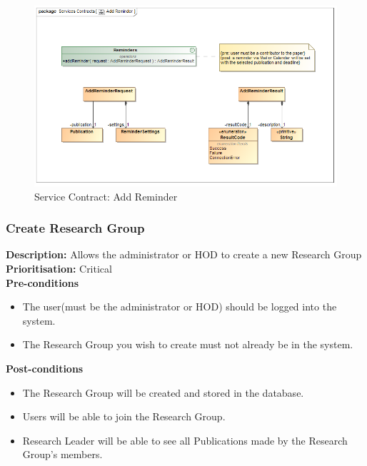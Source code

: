\documentclass[a4paper]{article}
\begin{document}
            	\begin{figure}[H]
            		\centering
            		\includegraphics[width=\textwidth]{5.1.10.Add.Reminder.Services.Contract.png}
            		\caption{Service Contract: Add Reminder}
            	\end{figure}
        
    \pagebreak
	\subsubsection{Create Research Group}
	\textbf{Description:} Allows the administrator or HOD to create a new Research Group\\
	\textbf{Prioritisation:} Critical\\
	
	\textbf{Pre-conditions}
	 \begin{itemize}
		\item The user(must be the administrator or HOD) should be logged into the system.
		\item The Research Group you wish to create must not already be in the system.
	\end{itemize}
	
	\textbf{Post-conditions}
	 \begin{itemize}
		\item The Research Group will be created and stored in the database.
		\item Users will be able to join the Research Group.
		\item Research Leader will be able to see all Publications made by the Research Group's members.
	\end{itemize}
	
\end{document}
